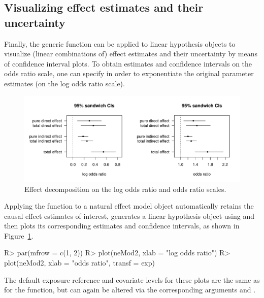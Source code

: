 \documentclass[nojss]{jss}
\begin{document}
\subsection{Visualizing effect estimates and their uncertainty}
Finally, the generic  function can be applied to linear hypothesis objects to visualize (linear combinations of) effect estimates and their uncertainty by means of confidence interval plots. To obtain estimates and confidence intervals on the odds ratio scale, one can specify  in order to exponentiate the original parameter estimates (on the log odds ratio scale).
\begin{figure}[h]
\begin{center}
\includegraphics{medflex-fig2}
\end{center}
\vspace{-0.8cm}
\caption{Effect decomposition on the log odds ratio and odds ratio scales.\label{plot-effdecomp}}
\end{figure}
\par Applying the  function to a natural effect model object automatically retains the causal effect estimates of interest, generates a linear hypothesis object using  and then plots its corresponding estimates and confidence intervals, as shown in Figure~\ref{plot-effdecomp}.
\begin{Schunk}
\begin{Sinput}
R> par(mfrow = c(1, 2))
R> plot(neMod2, xlab = "log odds ratio")
R> plot(neMod2, xlab = "odds ratio", transf = exp)
\end{Sinput}
\end{Schunk}
\par The default exposure reference and covariate levels for these plots are the same as for the  function, but can again be altered via the corresponding arguments  and .
\end{document}
